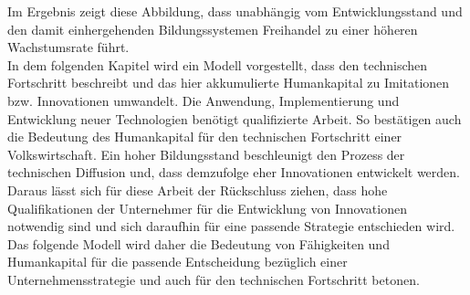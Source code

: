 %
Im Ergebnis zeigt diese Abbildung, dass unabhängig vom Entwicklungsstand und den damit einhergehenden Bildungssystemen Freihandel zu einer höheren Wachstumsrate führt. \\
%
In dem folgenden Kapitel wird ein Modell vorgestellt, dass den technischen Fortschritt beschreibt und das hier akkumulierte Humankapital zu Imitationen bzw. Innovationen umwandelt. Die Anwendung, Implementierung und Entwicklung neuer Technologien benötigt qualifizierte Arbeit. So bestätigen auch \cite{Nelson.1966} die Bedeutung des Humankapital für den technischen Fortschritt einer Volkswirtschaft. Ein hoher Bildungsstand beschleunigt den Prozess der technischen Diffusion und, dass demzufolge eher Innovationen entwickelt werden. Daraus lässt sich für diese Arbeit der Rückschluss ziehen, dass hohe Qualifikationen der Unternehmer für die Entwicklung von Innovationen notwendig sind und sich daraufhin für eine passende Strategie entschieden wird. Das folgende Modell wird daher die Bedeutung von Fähigkeiten und Humankapital für die passende Entscheidung bezüglich einer Unternehmensstrategie und auch für den technischen Fortschritt betonen.
